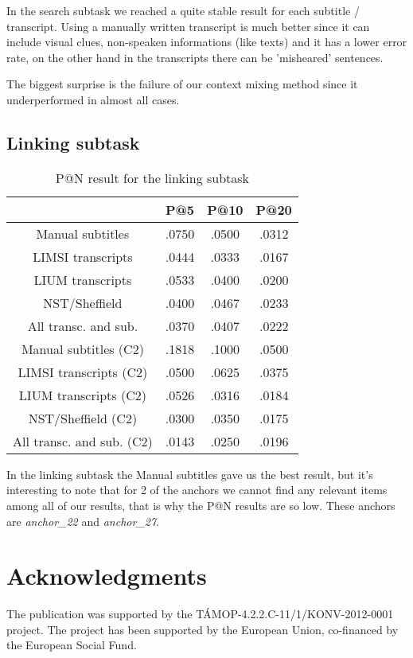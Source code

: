 \documentclass{acm_proc_article-me}
\begin{document}
In the search subtask we reached a quite stable result for each subtitle / transcript. Using a manually written transcript is much better since it can include visual clues, non-speaken informations (like texts) and it has a lower error rate, on the other hand in the transcripts there can be 'misheared' sentences. 

The biggest surprise is the failure of our context mixing method since it underperformed in almost all cases.

\subsection{Linking subtask}

\begin{table}[h]
\begin{tabular}{|c|c|c|c|}
	\hline 
	& P@5 & P@10 & P@20\tabularnewline
	\hline 
	\hline 
	Manual subtitles & .0750 & .0500 & .0312\tabularnewline
	\hline 
	LIMSI transcripts & .0444 & .0333 & .0167\tabularnewline
	\hline 
	LIUM transcripts & .0533 & .0400 & .0200\tabularnewline
	\hline 
	NST/Sheffield & .0400 & .0467 & .0233\tabularnewline
	\hline 
	All transc. and sub. & .0370 & .0407 & .0222\tabularnewline
	\hline 
	Manual subtitles (C2) & .1818 & .1000 & .0500\tabularnewline
	\hline 
	LIMSI transcripts (C2) & .0500 & .0625 & .0375\tabularnewline
	\hline 
	LIUM transcripts (C2) & .0526 & .0316 & .0184\tabularnewline
	\hline 
	NST/Sheffield (C2) & .0300 & .0350 & .0175\tabularnewline	
	\hline 
	All transc. and sub. (C2) & .0143 & .0250 & .0196\tabularnewline	
	\hline 
\end{tabular}
\caption{P@N result for the linking subtask}
\end{table}

In the linking subtask the Manual subtitles gave us the best result, but it's interesting to note that for 2 of the anchors we cannot find any relevant items among all of our results, that is why the P@N results are so low. These anchors are \textit{anchor\_22} and \textit{anchor\_27}.


\section{Acknowledgments}

The publication was supported by the T\'AMOP-4.2.2.C-11/1/KONV-2012-0001 project. The project has been supported by the European Union, co-financed by the European Social Fund.



\end{document}
